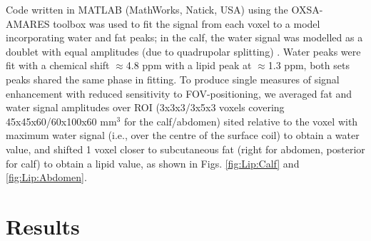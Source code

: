 Code written in MATLAB (MathWorks, Natick, USA) using the OXSA-AMARES \cite{Purvis2017OXSA:MATLAB} toolbox was used to fit the signal from each voxel to a model incorporating water and fat peaks; in the calf, the water signal was modelled as a doublet with equal amplitudes (due to quadrupolar splitting) \cite{Gursan2022ResidualMuscle}. Water peaks were fit with a chemical shift $\approx$4.8 ppm with a lipid peak at $\approx$1.3 ppm, both sets peaks shared the same phase in fitting. To produce single measures of signal enhancement with reduced sensitivity to \ac{FOV}-positioning, we averaged fat and water signal amplitudes over \ac{ROI} (3x3x3/3x5x3 voxels covering 45x45x60/60x100x60 mm$^3$ for the calf/abdomen) sited relative to the voxel with maximum water signal (i.e., over the centre of the surface coil) to obtain a water value, and shifted 1 voxel closer to subcutaneous fat (right for abdomen, posterior for calf) to obtain a lipid value, as shown in Figs. \ref{fig:Lip:Calf} and \ref{fig:Lip:Abdomen}.

\section{Results}


